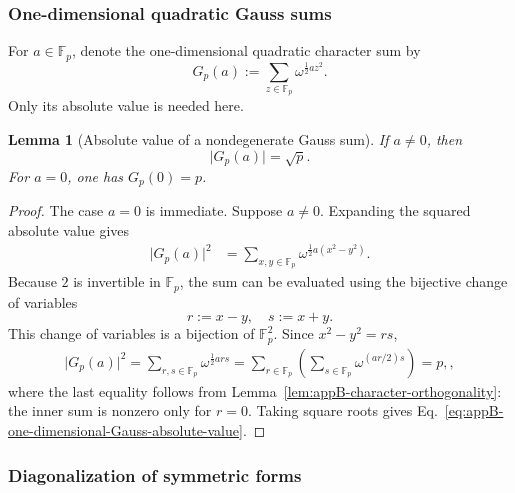 \documentclass[11pt]{article}
\newcommand{\F}{\mathbb F}
\newcommand{\1}{\mathbf 1}
\theoremstyle{plain}
\newtheorem{lemma}[theorem]{Lemma}
\theoremstyle{definition}
\theoremstyle{remark}
\begin{document}
\subsubsection{One-dimensional quadratic Gauss sums}
\label{appsubsec:one-dimensional-Gauss-sums}

For $a\in\F_p$, denote the one-dimensional quadratic character sum by
\begin{equation}
  G_p(a):=\sum_{z\in\F_p}\omega^{\frac12az^2}.
  \label{eq:appB-Gauss-sum-definition}
\end{equation}
Only its absolute value is needed here.

\begin{lemma}[Absolute value of a nondegenerate Gauss sum]
\label{lem:appB-one-dimensional-Gauss-absolute-value}
If $a\ne0$, then
\begin{equation}
  \lvert G_p(a)\rvert=\sqrt p.
  \label{eq:appB-one-dimensional-Gauss-absolute-value}
\end{equation}
For $a=0$, one has $G_p(0)=p$.
\end{lemma}

\begin{proof}
The case $a=0$ is immediate.  Suppose $a\ne0$.  Expanding the squared absolute value gives
\begin{align}
  \lvert G_p(a)\rvert^2
  &=\sum_{x,y\in\F_p}
    \omega^{\frac12a(x^2-y^2)}.                                  \label{eq:appB-Gauss-square-1}
\end{align}
Because $2$ is invertible in $\F_p$, the sum can be evaluated using the
bijective change of variables
\begin{equation}
  r:=x-y,
  \quad
  s:=x+y.
  \label{eq:appB-Gauss-change-variables}
\end{equation}
This change of variables is a bijection of $\F_p^2$.  Since $x^2-y^2=rs$,
\begin{align}
  \lvert G_p(a)\rvert^2
  =\sum_{r,s\in\F_p}\omega^{\frac12ars}
  =\sum_{r\in\F_p}
    \left(\sum_{s\in\F_p}\omega^{(ar/2)s}\right)
=p,                                                            \label{eq:appB-Gauss-square-2},
\end{align}
where the last equality follows from
Lemma~\ref{lem:appB-character-orthogonality}: the inner sum is nonzero only
for $r=0$.  Taking square roots gives
Eq.~\eqref{eq:appB-one-dimensional-Gauss-absolute-value}.
\end{proof}

\subsubsection{Diagonalization of symmetric forms}
\label{appsubsec:symmetric-form-diagonalization}
\end{document}
